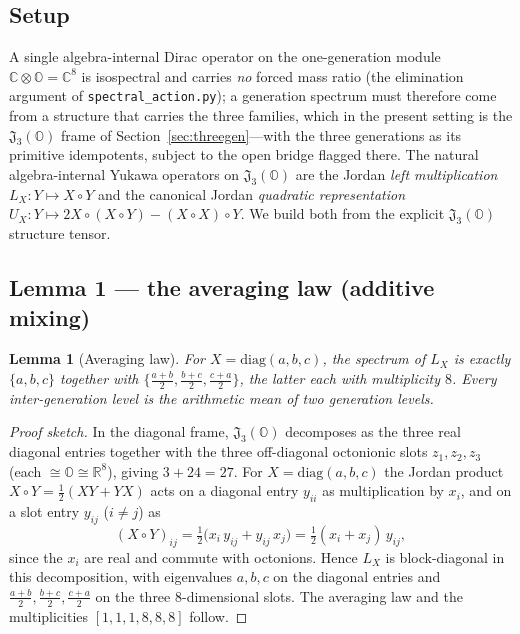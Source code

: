 \documentclass[11pt,a4paper]{article}
\theoremstyle{plain}
\newtheorem{lemma}{Lemma}
\newcommand{\JO}{\mathfrak{J}_3(\mathbb{O})}
\newcommand{\code}[1]{\texttt{#1}}
\begin{document}
\subsection{Setup}

A single algebra-internal Dirac operator on the one-generation module
$\mathbb{C}\otimes\mathbb{O} = \mathbb{C}^8$ is isospectral and carries \emph{no}
forced mass ratio (the elimination argument of \code{spectral\_action.py}); a
generation spectrum must therefore come from a structure that carries the three
families, which in the present setting is the $\JO$ frame of
Section~\ref{sec:threegen}---with the three generations as its primitive
idempotents, subject to the open bridge flagged there. The natural algebra-internal Yukawa operators on $\JO$ are the Jordan
\emph{left multiplication} $L_X : Y \mapsto X \circ Y$ and the canonical Jordan
\emph{quadratic representation} $U_X : Y \mapsto 2X\circ(X\circ Y) - (X\circ X)\circ Y$.
We build both from the explicit $\JO$ structure tensor.

\subsection{Lemma 1 --- the averaging law (additive mixing)}

\begin{lemma}[Averaging law]
\label{thm:avg}
For $X = \mathrm{diag}(a,b,c)$, the spectrum of $L_X$ is exactly $\{a,b,c\}$
together with $\bigl\{\tfrac{a+b}{2}, \tfrac{b+c}{2}, \tfrac{c+a}{2}\bigr\}$, the
latter each with multiplicity $8$. Every inter-generation level is the
\emph{arithmetic mean} of two generation levels.
\end{lemma}

\begin{proof}[Proof sketch]
In the diagonal frame, $\JO$ decomposes as the three real diagonal entries
together with the three off-diagonal octonionic slots $z_1, z_2, z_3$ (each
$\cong \mathbb{O} \cong \mathbb{R}^8$), giving $3 + 24 = 27$. For
$X = \mathrm{diag}(a,b,c)$ the Jordan product $X \circ Y = \tfrac12(XY + YX)$ acts
on a diagonal entry $y_{ii}$ as multiplication by $x_i$, and on a slot entry
$y_{ij}$ ($i \neq j$) as
\[
  (X \circ Y)_{ij} = \tfrac12\bigl(x_i\, y_{ij} + y_{ij}\, x_j\bigr)
                   = \tfrac12 (x_i + x_j)\, y_{ij},
\]
since the $x_i$ are real and commute with octonions. Hence $L_X$ is block-diagonal
in this decomposition, with eigenvalues $a,b,c$ on the diagonal entries and
$\tfrac{a+b}{2}, \tfrac{b+c}{2}, \tfrac{c+a}{2}$ on the three $8$-dimensional
slots. The averaging law and the multiplicities $[1,1,1,8,8,8]$ follow.
\end{proof}
\end{document}
